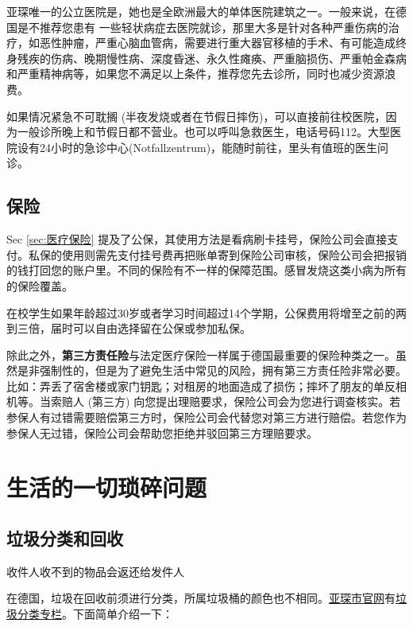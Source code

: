     亚琛唯一的公立医院是，她也是全欧洲最大的单体医院建筑之一。一般来说，在德国是不推荐您患有 一些轻状病症去医院就诊，那里大多是针对各种严重伤病的治疗，如恶性肿瘤，严重心脑血管病，需要进行重大器官移植的手术、有可能造成终身残疾的伤病、晚期慢性病、深度昏迷、永久性瘫痪、严重脑损伤、严重帕金森病和严重精神病等，如果您不满足以上条件，推荐您先去诊所，同时也减少资源浪费。

    如果情况紧急不可耽搁 (半夜发烧或者在节假日摔伤)，可以直接前往校医院，因为一般诊所晚上和节假日都不营业。也可以呼叫急救医生，电话号码112。大型医院设有24小时的急诊中心(Notfallzentrum)，能随时前往，里头有值班的医生问诊。

  \subsection{保险}\label{subsec:保险}

    Sec \ref{sec:医疗保险} 提及了公保，其使用方法是看病刷卡挂号，保险公司会直接支付。私保的使用则需先支付挂号费再把账单寄到保险公司审核，保险公司会把报销的钱打回您的账户里。不同的保险有不一样的保障范围。感冒发烧这类小病为所有的保险覆盖。

    在校学生如果年龄超过30岁或者学习时间超过14个学期，公保费用将增至之前的两到三倍，届时可以自由选择留在公保或参加私保。

    除此之外，\textbf{第三方责任险}与法定医疗保险一样属于德国最重要的保险种类之一。虽然是非强制性的，但是为了避免生活中常见的风险，拥有第三方责任险非常必要。比如：弄丢了宿舍楼或家门钥匙；对租房的地面造成了损伤；摔坏了朋友的单反相机等。当索赔人 (第三方) 向您提出理赔要求，保险公司会为您进行调查核实。若参保人有过错需要赔偿第三方时，保险公司会代替您对第三方进行赔偿。若您作为参保人无过错，保险公司会帮助您拒绝并驳回第三方理赔要求。

\section{生活的一切琐碎问题}\label{sec:生活的一切琐碎问题}

  \subsection{垃圾分类和回收}\label{subsec:垃圾分类和回收}

    收件人收不到的物品会返还给发件人

    在德国，垃圾在回收前须进行分类，所属垃圾桶的颜色也不相同。\href{http://www.aachen.de/CHIN/kurzinfo.html}{亚琛市官网}有\href{http://www.aachen.de/de/stadt_buerger/aachener_stadtbetrieb/leistungen/abfallwirtschaft/abfalltrennung/index.html}{垃圾分类专栏}。下面简单介绍一下：

